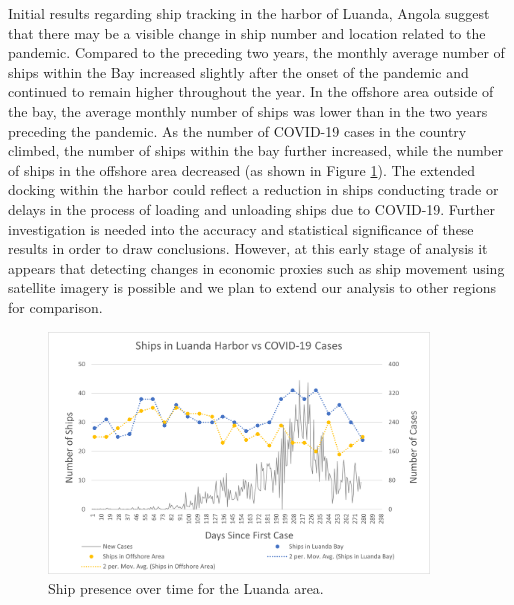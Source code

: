 Initial results regarding ship tracking in the harbor of Luanda, Angola suggest that there may be a visible change in ship number and location related to the pandemic. Compared to the preceding two years, the monthly average number of ships within the Bay increased slightly after the onset of the pandemic and continued to remain higher throughout the year. In the offshore area outside of the bay, the average monthly number of ships was lower than in the two years preceding the pandemic. As the number of COVID-19 cases in the country climbed, the number of ships within the bay further increased, while the number of ships in the offshore area decreased (as shown in Figure \ref{fig:shipst}). The extended docking within the harbor could reflect a reduction in ships conducting trade or delays in the process of loading and unloading ships due to COVID-19.  Further investigation is needed into the accuracy and statistical significance of these results in order to draw conclusions. However, at this early stage of analysis it appears that detecting changes in economic proxies such as ship movement using satellite imagery is possible and we plan to extend our analysis to other regions for comparison.

\begin{figure}[h]
\centering
\includegraphics[width=0.9\textwidth]{Figures/chap5/ships_over_time.png}
\caption{Ship presence over time for the Luanda area.}
\label{fig:shipst}
\end{figure}

\subsubsection{}

\subsubsection{}



